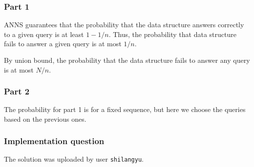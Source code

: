 \documentclass[a4paper, 11pt]{article}
\begin{document}
\subsubsection*{Part 1}

ANNS guarantees that the probability that the data structure answers correctly to a given query is at least $1-1/n$. Thus, the probability that data structure fails to answer a given query is at most $1/n$.

By union bound, the probability that the data structure fails to answer any query is at most $N/n$.

\subsubsection*{Part 2}

The probability for part 1 is for a fixed sequence, but here we choose the queries based on the previous ones.

\subsubsection*{Implementation question}

The solution was uploaded by user \texttt{shilangyu}.
\end{document}
